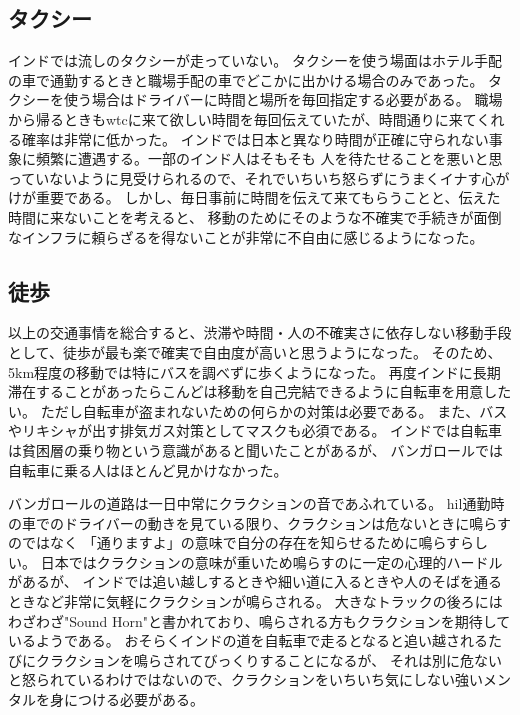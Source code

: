 \subsection{タクシー}
インドでは流しのタクシーが走っていない。
タクシーを使う場面はホテル手配の車で通勤するときと職場手配の車でどこかに出かける場合のみであった。
タクシーを使う場合はドライバーに時間と場所を毎回指定する必要がある。
職場から帰るときも\acrshort{wtc}に来て欲しい時間を毎回伝えていたが、時間通りに来てくれる確率は非常に低かった。
インドでは日本と異なり時間が正確に守られない事象に頻繁に遭遇する。一部のインド人はそもそも
人を待たせることを悪いと思っていないように見受けられるので、それでいちいち怒らずにうまくイナす心がけが重要である。
しかし、毎日事前に時間を伝えて来てもらうことと、伝えた時間に来ないことを考えると、
移動のためにそのような不確実で手続きが面倒なインフラに頼らざるを得ないことが非常に不自由に感じるようになった。
\subsection{徒歩}
以上の交通事情を総合すると、渋滞や時間・人の不確実さに依存しない移動手段として、徒歩が最も楽で確実で自由度が高いと思うようになった。
そのため、5km程度の移動では特にバスを調べずに歩くようになった。
再度インドに長期滞在することがあったらこんどは移動を自己完結できるように自転車を用意したい。
ただし自転車が盗まれないための何らかの対策は必要である。
また、バスやリキシャが出す排気ガス対策としてマスクも必須である。
インドでは自転車は貧困層の乗り物という意識があると聞いたことがあるが、
バンガロールでは自転車に乗る人はほとんど見かけなかった。
\par
バンガロールの道路は一日中常にクラクションの音であふれている。
\acrshort{hil}通勤時の車でのドライバーの動きを見ている限り、クラクションは危ないときに鳴らすのではなく
「通りますよ」の意味で自分の存在を知らせるために鳴らすらしい。
日本ではクラクションの意味が重いため鳴らすのに一定の心理的ハードルがあるが、
インドでは追い越しするときや細い道に入るときや人のそばを通るときなど非常に気軽にクラクションが鳴らされる。
大きなトラックの後ろにはわざわざ"Sound Horn"と書かれており、鳴らされる方もクラクションを期待しているようである。
おそらくインドの道を自転車で走るとなると追い越されるたびにクラクションを鳴らされてびっくりすることになるが、
それは別に危ないと怒られているわけではないので、クラクションをいちいち気にしない強いメンタルを身につける必要がある。
